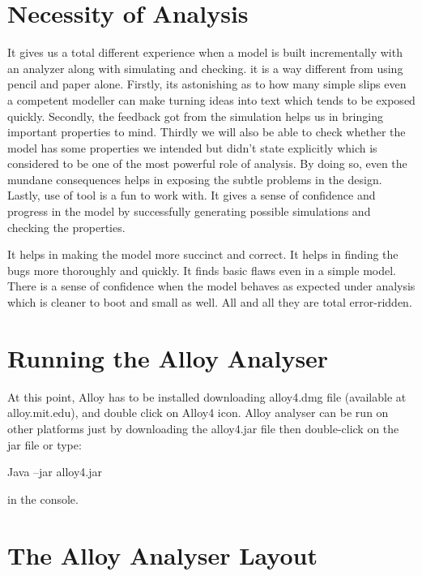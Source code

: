 \documentclass[a4paper,12pt]{report}
\begin{document}
\begin{onehalfspacing}
\section{Necessity of Analysis}
\label{Necessity of analysis}

It gives us a total different experience when a model is built incrementally with an analyzer along with simulating and checking. it is a way different from using pencil and paper alone. Firstly, its astonishing as to how many simple slips even a competent modeller can make turning ideas into text which tends to be exposed quickly. Secondly, the feedback got from the simulation helps us in bringing important properties to mind. Thirdly we will also be able to check whether the model has some properties we intended but didn't state explicitly which is considered to be one of the most powerful role of analysis. By doing so, even the mundane consequences helps in exposing the subtle problems in the design. Lastly, use of tool is a fun to work with. It gives a sense of confidence and progress in the model by successfully generating possible simulations and checking the properties. 

It helps in making the model more succinct and correct. It helps in finding the bugs more thoroughly and quickly. It finds basic flaws even in a simple model. There is a sense of confidence when the model behaves as expected under analysis which is cleaner to boot and small as well. All and all they are total error-ridden.
   
\section{Running the Alloy Analyser}
\label{Run Alloy Analyzer}

At this point, Alloy has to be installed downloading alloy4.dmg file (available at alloy.mit.edu), and double click on Alloy4 icon. Alloy analyser can be run on other platforms just by downloading the alloy4.jar file then double-click on the jar file or type:

\begin{center}
Java –jar alloy4.jar
\end{center}

in the console.

\section{The Alloy Analyser Layout}
\label{Alloy Analyser layout}


\end{onehalfspacing}
\end{document}
